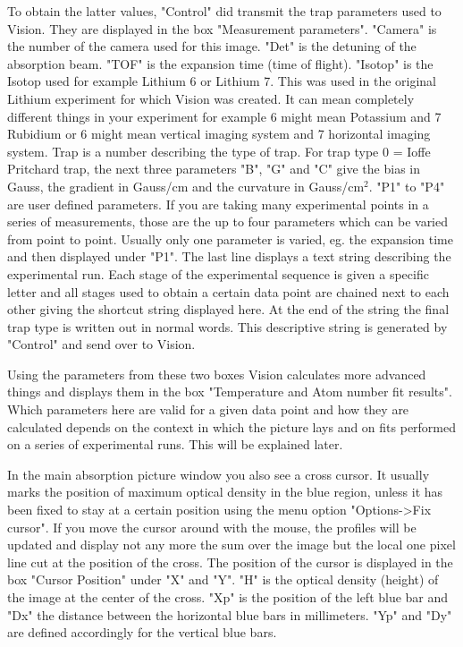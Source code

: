 \documentclass[10pt]{article}
\begin{document}
To obtain the latter values, "Control" did transmit the trap
parameters used to Vision. They are displayed in the box
"Measurement parameters". "Camera" is the number of the camera
used for this image. "Det" is the detuning of the absorption beam.
"TOF" is the expansion time (time of flight). "Isotop" is the
Isotop used for example Lithium 6 or Lithium 7. This was used in
the original Lithium experiment for which Vision was created. It
can mean completely different things in your experiment for
example 6 might mean Potassium and 7 Rubidium or 6 might mean
vertical imaging system and 7 horizontal imaging system. Trap is a
number describing the type of trap. For trap type 0 = Ioffe
Pritchard trap, the next three parameters "B", "G" and "C" give
the bias in Gauss, the gradient in Gauss/cm and the curvature in
Gauss/cm$^2$. "P1" to "P4" are user defined parameters. If you are
taking many experimental points in a series of measurements, those
are the up to four parameters which can be varied from point to
point. Usually only one parameter is varied, eg. the expansion
time and then displayed under "P1". The last line displays a text
string describing the experimental run. Each stage of the
experimental sequence is given a specific letter and all stages
used to obtain a certain data point are chained next to each other
giving the shortcut string displayed here. At the end of the
string the final trap type is written out in normal words. This
descriptive string is generated by "Control" and send over to
Vision.

Using the parameters from these two boxes Vision calculates more
advanced things and displays them in the box "Temperature and Atom
number fit results". Which parameters here are valid for a given
data point and how they are calculated depends on the context in
which the picture lays and on fits performed on a series of
experimental runs. This will be explained later.

In the main absorption picture window you also see a cross cursor.
It usually marks the position of maximum optical density in the
blue region, unless it has been fixed to stay at a certain
position using the menu option "Options->Fix cursor". If you move
the cursor around with the mouse, the profiles will be updated and
display not any more the sum over the image but the local one
pixel line cut at the position of the cross. The position of the
cursor is displayed in the box "Cursor Position" under "X" and
"Y". "H" is the optical density (height) of the image at the
center of the cross. "Xp" is the position of the left blue bar and
"Dx" the distance between the horizontal blue bars in millimeters.
"Yp" and "Dy" are defined accordingly for the vertical blue bars.
\end{document}
